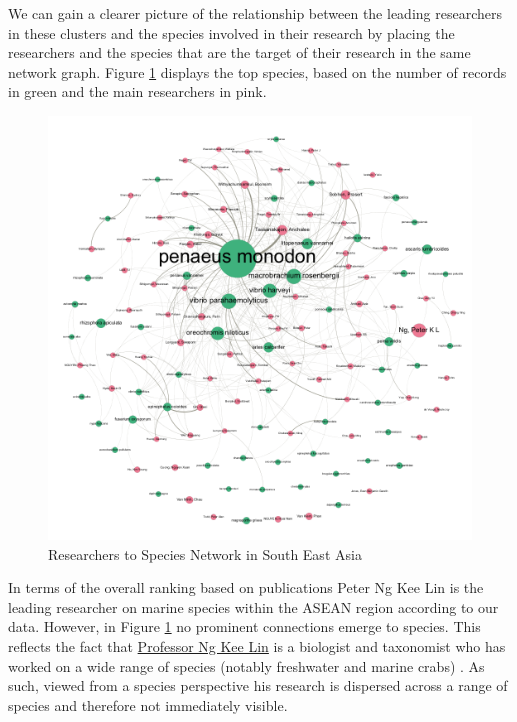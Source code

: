 \documentclass[]{book}
\theoremstyle{definition}
\theoremstyle{definition}
\theoremstyle{definition}
\theoremstyle{remark}
\begin{document}
We can gain a clearer picture of the relationship between the leading
researchers in these clusters and the species involved in their research
by placing the researchers and the species that are the target of their
research in the same network graph. Figure
\ref{fig:speciesresearchernetwork} displays the top species, based on
the number of records in green and the main researchers in pink.

\begin{figure}

{\centering \includegraphics[width=1\linewidth]{images/asean_authors_species_directed} 

}

\caption{Researchers to Species Network in South East Asia}\label{fig:speciesresearchernetwork}
\end{figure}

In terms of the overall ranking based on publications Peter Ng Kee Lin
is the leading researcher on marine species within the ASEAN region
according to our data. However, in Figure
\ref{fig:speciesresearchernetwork} no prominent connections emerge to
species. This reflects the fact that
\href{https://lkcnhm.nus.edu.sg/dna/people/details/17}{Professor Ng Kee
Lin} is a biologist and taxonomist who has worked on a wide range of
species (notably freshwater and marine crabs)
\citep{Cai_2002, Shih_2007}. As such, viewed from a species perspective
his research is dispersed across a range of species and therefore not
immediately visible.
\end{document}
